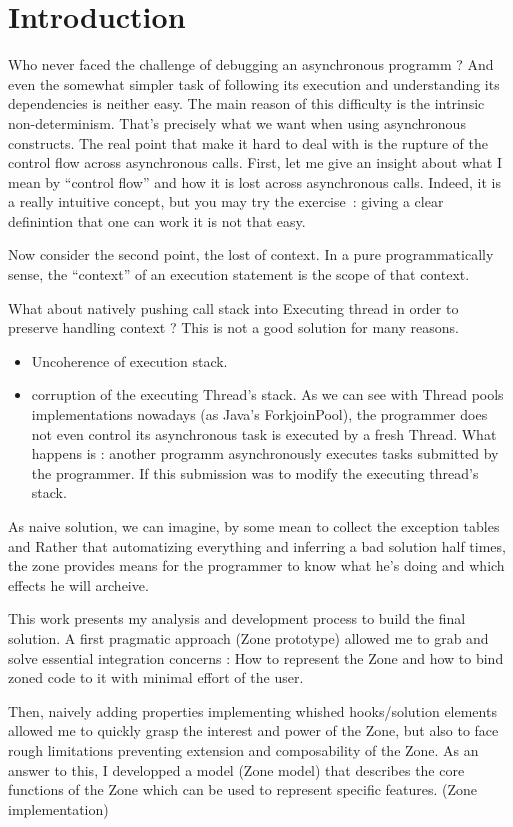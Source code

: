 
\chapter{Introduction}


Who never faced the challenge of debugging an asynchronous programm ? And even the somewhat simpler task of following its execution and understanding its dependencies is neither easy.
The main reason of this difficulty is the intrinsic non-determinism. That's precisely what we want when using asynchronous constructs. The real point that make it hard to deal with is the rupture of the control flow across asynchronous calls.
First, let me give an insight about what I mean by ``control flow'' and how it is lost across asynchronous calls. Indeed, it is a really intuitive concept, but you may try the exercise~: giving a clear definintion that one can work it is not that easy.

Now consider the second point, the lost of context. In a pure programmatically sense, the ``context'' of an execution statement is the scope of that context. 


What about natively pushing call stack into Executing thread in order to preserve handling context ? This is not a good solution for many reasons.
\begin{itemize}
\item Uncoherence of execution stack. 
\item corruption of the executing Thread's stack. As we can see with Thread pools implementations nowadays (as Java's ForkjoinPool), the programmer does not even control its asynchronous task is executed by a fresh Thread. What happens is : another programm asynchronously executes tasks submitted by the programmer. If this submission was to modify the executing thread's stack.
\end{itemize}
As naive solution, we can imagine, by some mean to collect the exception tables and 
Rather that automatizing everything and inferring a bad solution half times, the zone provides means for the programmer to know what he's doing and which effects he will archeive.

This work presents my analysis and development process to build the final solution. A first pragmatic approach (Zone prototype) allowed me to grab and solve essential integration concerns : How to represent the Zone and how to bind zoned code to it with minimal effort of the user.

Then, naively adding properties implementing whished hooks/solution elements allowed me to quickly grasp the interest and power of the Zone, but also to face rough limitations preventing extension and composability of the Zone. As an answer to this, I developped a model (Zone model) that describes the core functions of the Zone which can be used to represent specific features. (Zone implementation)

